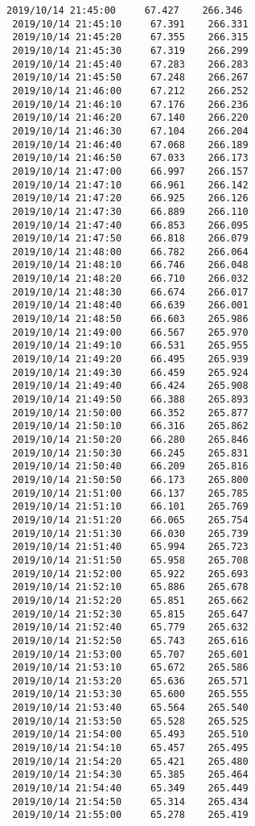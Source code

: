 \documentclass[11pt]{article}
\begin{document}
\begin{Verbatim}[commandchars=\\\{\}]
 2019/10/14 21:45:00     67.427    266.346
 2019/10/14 21:45:10     67.391    266.331
 2019/10/14 21:45:20     67.355    266.315
 2019/10/14 21:45:30     67.319    266.299
 2019/10/14 21:45:40     67.283    266.283
 2019/10/14 21:45:50     67.248    266.267
 2019/10/14 21:46:00     67.212    266.252
 2019/10/14 21:46:10     67.176    266.236
 2019/10/14 21:46:20     67.140    266.220
 2019/10/14 21:46:30     67.104    266.204
 2019/10/14 21:46:40     67.068    266.189
 2019/10/14 21:46:50     67.033    266.173
 2019/10/14 21:47:00     66.997    266.157
 2019/10/14 21:47:10     66.961    266.142
 2019/10/14 21:47:20     66.925    266.126
 2019/10/14 21:47:30     66.889    266.110
 2019/10/14 21:47:40     66.853    266.095
 2019/10/14 21:47:50     66.818    266.079
 2019/10/14 21:48:00     66.782    266.064
 2019/10/14 21:48:10     66.746    266.048
 2019/10/14 21:48:20     66.710    266.032
 2019/10/14 21:48:30     66.674    266.017
 2019/10/14 21:48:40     66.639    266.001
 2019/10/14 21:48:50     66.603    265.986
 2019/10/14 21:49:00     66.567    265.970
 2019/10/14 21:49:10     66.531    265.955
 2019/10/14 21:49:20     66.495    265.939
 2019/10/14 21:49:30     66.459    265.924
 2019/10/14 21:49:40     66.424    265.908
 2019/10/14 21:49:50     66.388    265.893
 2019/10/14 21:50:00     66.352    265.877
 2019/10/14 21:50:10     66.316    265.862
 2019/10/14 21:50:20     66.280    265.846
 2019/10/14 21:50:30     66.245    265.831
 2019/10/14 21:50:40     66.209    265.816
 2019/10/14 21:50:50     66.173    265.800
 2019/10/14 21:51:00     66.137    265.785
 2019/10/14 21:51:10     66.101    265.769
 2019/10/14 21:51:20     66.065    265.754
 2019/10/14 21:51:30     66.030    265.739
 2019/10/14 21:51:40     65.994    265.723
 2019/10/14 21:51:50     65.958    265.708
 2019/10/14 21:52:00     65.922    265.693
 2019/10/14 21:52:10     65.886    265.678
 2019/10/14 21:52:20     65.851    265.662
 2019/10/14 21:52:30     65.815    265.647
 2019/10/14 21:52:40     65.779    265.632
 2019/10/14 21:52:50     65.743    265.616
 2019/10/14 21:53:00     65.707    265.601
 2019/10/14 21:53:10     65.672    265.586
 2019/10/14 21:53:20     65.636    265.571
 2019/10/14 21:53:30     65.600    265.555
 2019/10/14 21:53:40     65.564    265.540
 2019/10/14 21:53:50     65.528    265.525
 2019/10/14 21:54:00     65.493    265.510
 2019/10/14 21:54:10     65.457    265.495
 2019/10/14 21:54:20     65.421    265.480
 2019/10/14 21:54:30     65.385    265.464
 2019/10/14 21:54:40     65.349    265.449
 2019/10/14 21:54:50     65.314    265.434
 2019/10/14 21:55:00     65.278    265.419

\end{Verbatim}
\end{document}
